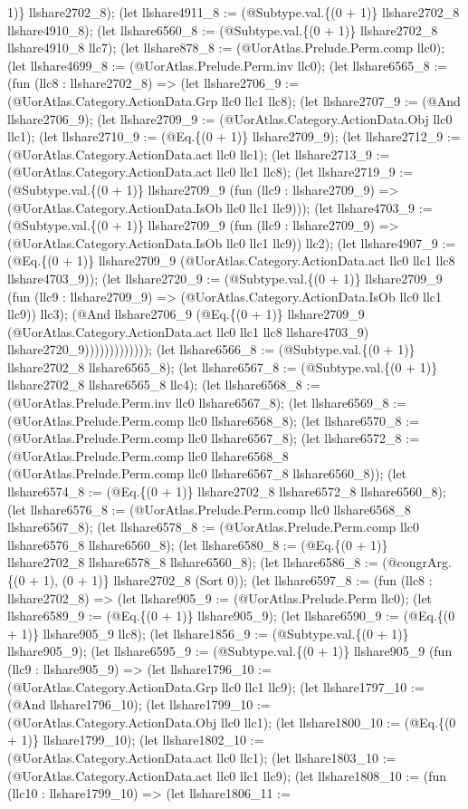 \documentclass[11pt]{article}
\begin{document}
1)\} llshare2702\_8); (let llshare4911\_8 := (@Subtype.val.\{(0 + 1)\} llshare2702\_8 llshare4910\_8); (let llshare6560\_8 := (@Subtype.val.\{(0 + 1)\} llshare2702\_8 llshare4910\_8 llc7); (let llshare878\_8 := (@UorAtlas.Prelude.Perm.comp llc0); (let llshare4699\_8 := (@UorAtlas.Prelude.Perm.inv llc0); (let llshare6565\_8 := (fun (llc8 : llshare2702\_8) => (let llshare2706\_9 := (@UorAtlas.Category.ActionData.Grp llc0 llc1 llc8); (let llshare2707\_9 := (@And llshare2706\_9); (let llshare2709\_9 := (@UorAtlas.Category.ActionData.Obj llc0 llc1); (let llshare2710\_9 := (@Eq.\{(0 + 1)\} llshare2709\_9); (let llshare2712\_9 := (@UorAtlas.Category.ActionData.act llc0 llc1); (let llshare2713\_9 := (@UorAtlas.Category.ActionData.act llc0 llc1 llc8); (let llshare2719\_9 := (@Subtype.val.\{(0 + 1)\} llshare2709\_9 (fun (llc9 : llshare2709\_9) => (@UorAtlas.Category.ActionData.IsOb llc0 llc1 llc9))); (let llshare4703\_9 := (@Subtype.val.\{(0 + 1)\} llshare2709\_9 (fun (llc9 : llshare2709\_9) => (@UorAtlas.Category.ActionData.IsOb llc0 llc1 llc9)) llc2); (let llshare4907\_9 := (@Eq.\{(0 + 1)\} llshare2709\_9 (@UorAtlas.Category.ActionData.act llc0 llc1 llc8 llshare4703\_9)); (let llshare2720\_9 := (@Subtype.val.\{(0 + 1)\} llshare2709\_9 (fun (llc9 : llshare2709\_9) => (@UorAtlas.Category.ActionData.IsOb llc0 llc1 llc9)) llc3); (@And llshare2706\_9 (@Eq.\{(0 + 1)\} llshare2709\_9 (@UorAtlas.Category.ActionData.act llc0 llc1 llc8 llshare4703\_9) llshare2720\_9))))))))))))); (let llshare6566\_8 := (@Subtype.val.\{(0 + 1)\} llshare2702\_8 llshare6565\_8); (let llshare6567\_8 := (@Subtype.val.\{(0 + 1)\} llshare2702\_8 llshare6565\_8 llc4); (let llshare6568\_8 := (@UorAtlas.Prelude.Perm.inv llc0 llshare6567\_8); (let llshare6569\_8 := (@UorAtlas.Prelude.Perm.comp llc0 llshare6568\_8); (let llshare6570\_8 := (@UorAtlas.Prelude.Perm.comp llc0 llshare6567\_8); (let llshare6572\_8 := (@UorAtlas.Prelude.Perm.comp llc0 llshare6568\_8 (@UorAtlas.Prelude.Perm.comp llc0 llshare6567\_8 llshare6560\_8)); (let llshare6574\_8 := (@Eq.\{(0 + 1)\} llshare2702\_8 llshare6572\_8 llshare6560\_8); (let llshare6576\_8 := (@UorAtlas.Prelude.Perm.comp llc0 llshare6568\_8 llshare6567\_8); (let llshare6578\_8 := (@UorAtlas.Prelude.Perm.comp llc0 llshare6576\_8 llshare6560\_8); (let llshare6580\_8 := (@Eq.\{(0 + 1)\} llshare2702\_8 llshare6578\_8 llshare6560\_8); (let llshare6586\_8 := (@congrArg.\{(0 + 1), (0 + 1)\} llshare2702\_8 (Sort 0)); (let llshare6597\_8 := (fun (llc8 : llshare2702\_8) => (let llshare905\_9 := (@UorAtlas.Prelude.Perm llc0); (let llshare6589\_9 := (@Eq.\{(0 + 1)\} llshare905\_9); (let llshare6590\_9 := (@Eq.\{(0 + 1)\} llshare905\_9 llc8); (let llshare1856\_9 := (@Subtype.val.\{(0 + 1)\} llshare905\_9); (let llshare6595\_9 := (@Subtype.val.\{(0 + 1)\} llshare905\_9 (fun (llc9 : llshare905\_9) => (let llshare1796\_10 := (@UorAtlas.Category.ActionData.Grp llc0 llc1 llc9); (let llshare1797\_10 := (@And llshare1796\_10); (let llshare1799\_10 := (@UorAtlas.Category.ActionData.Obj llc0 llc1); (let llshare1800\_10 := (@Eq.\{(0 + 1)\} llshare1799\_10); (let llshare1802\_10 := (@UorAtlas.Category.ActionData.act llc0 llc1); (let llshare1803\_10 := (@UorAtlas.Category.ActionData.act llc0 llc1 llc9); (let llshare1808\_10 := (fun (llc10 : llshare1799\_10) => (let llshare1806\_11 := 
\end{document}
